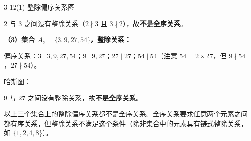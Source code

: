 \documentclass[11pt]{article}
\begin{document}
\begin{question}{3-12(1) 整除偏序关系图}
\begin{answer}
    $2$ 与 $3$ 之间没有整除关系（$2 \nmid 3$ 且 $3 \nmid 2$），故\textbf{不是全序关系}。

    \vspace{1em}
    \noindent\textbf{（3）集合 $A_3 = \{3,9,27,54\}$，整除关系：}

    偏序关系：$3 \mid 3,9,27,54$；$9 \mid 9,27$；$27 \mid 27$；$54 \mid 54$（注意 $54 = 2 \times 27$，但 $9 \nmid 54$，$27 \nmid 54$）。

    哈斯图：
    \begin{center}
    \end{center}

    $9$ 与 $27$ 之间没有整除关系，故\textbf{不是全序关系}。

    \vspace{1em}
    \begin{info}[结论:]
      以上三个集合上的整除偏序关系都不是全序关系。全序关系要求任意两个元素之间都有序关系，但整除关系不满足这个条件（除非集合中的元素具有链式整除关系，如 $\{1,2,4,8\}$）。
    \end{info}
  \end{answer}
\end{question}

\end{document}
